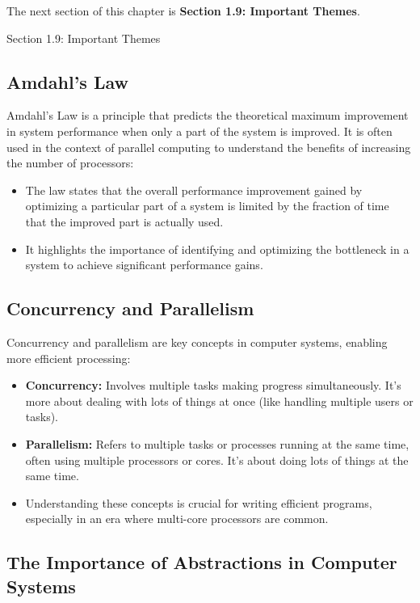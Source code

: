 The next section of this chapter is \textbf{Section 1.9: Important Themes}.

\begin{notes}{Section 1.9: Important Themes}
    \subsection*{Amdahl's Law}

    Amdahl's Law is a principle that predicts the theoretical maximum improvement in system performance when only a part of the system is improved. It is often used in the context of parallel computing 
    to understand the benefits of increasing the number of processors: \vspace*{1em}

    \begin{itemize}
        \item The law states that the overall performance improvement gained by optimizing a particular part of a system is limited by the fraction of time that the improved part is actually used.
        \item It highlights the importance of identifying and optimizing the bottleneck in a system to achieve significant performance gains.
    \end{itemize}
    
    \subsection*{Concurrency and Parallelism}

    Concurrency and parallelism are key concepts in computer systems, enabling more efficient processing:

    \begin{itemize}
        \item \textbf{Concurrency:} Involves multiple tasks making progress simultaneously. It's more about dealing with lots of things at once (like handling multiple users or tasks).
        \item \textbf{Parallelism:} Refers to multiple tasks or processes running at the same time, often using multiple processors or cores. It's about doing lots of things at the same time.
        \item Understanding these concepts is crucial for writing efficient programs, especially in an era where multi-core processors are common.
    \end{itemize}
    
    \subsection*{The Importance of Abstractions in Computer Systems}


\end{notes}
